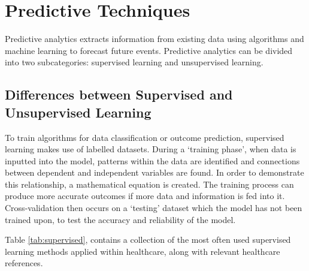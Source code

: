 \documentclass[../thesis.tex]{subfiles}
\begin{document}




\section{Predictive Techniques}\label{sec:PredictiveTechniques}
Predictive analytics extracts information from existing data using algorithms and machine learning to forecast future events. Predictive analytics can be divided into two subcategories: supervised learning and unsupervised learning.

\subsection{Differences between Supervised and Unsupervised Learning}
To train algorithms for data classification or outcome prediction, supervised learning makes use of labelled datasets. During a `training phase', when data is inputted into the model, patterns within the data are identified and connections between dependent and independent variables are found. In order to demonstrate this relationship, a mathematical equation is created. The training process can produce more accurate outcomes if more data and information is fed into it. Cross-validation then occurs on a `testing' dataset which the model has not been trained upon, to test the accuracy and reliability of the model.

Table \ref{tab:supervised}, contains a collection of the most often used supervised learning methods applied within healthcare, along with relevant healthcare references. 
\end{document}
